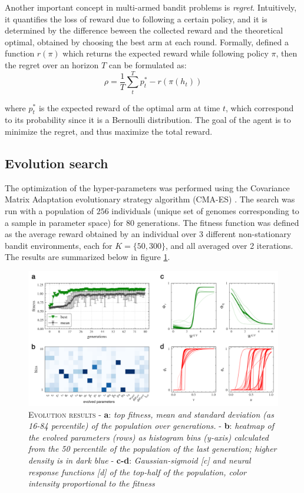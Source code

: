 Another important concept in multi-armed bandit problems is \textit{regret}. Intuitively, it quantifies the loss of reward due to following a certain policy, and it is determined by the difference beween the collected reward and the theoretical optimal, obtained by choosing the best arm at each round.
Formally, defined a function $r(\pi)$ which returns the expected reward while following policy $\pi$, then the regret over an horizon $T$ can be formulated as:
\begin{equation}
    \rho = \frac{1}{T}\sum^{T}_{t} p^{*}_{t} -r(\pi(h_{t}))
\end{equation}

\noindent where $p^{*}_{t}$ is the expected reward of the optimal arm at time $t$, which correspond to its probability since it is a Bernoulli distribution.
\noindent The goal of the agent is to minimize the regret, and thus maximize the total reward.



\subsection{Evolution search}
The optimization of the hyper-parameters was performed using the Covariance Matrix Adaptation evolutionary strategy algorithm (CMA-ES) \cite{igelCovarianceMatrixAdaptation2007}.
The search was run with a population of $256$ individuals (unique set of genomes corresponding to a sample in parameter space) for $80$ generations.
The fitness function was defined as the average reward obtained by an individual over 3 different non-stationary bandit environments, each for $K=\{50, 300\}$, and all averaged over 2 iterations.
The results are summarized below in figure \ref{fig:evolution}.

\begin{figure}[H]
    \centering
    \includegraphics[width=1.0\textwidth]{figures/evolution_comp_1.png}
    \caption{\textsc{Evolution results} - \textbf{a}: \textit{top fitness, mean and standard deviation (as 16-84 percentile) of the population over generations.} - \textbf{b}: \textit{heatmap of the evolved parameters (rows) as histogram bins (y-axis) calculated from the 50 percentile of the
    population of the last generation; higher density is in dark blue} - \textbf{c-d}: \textit{Gaussian-sigmoid [c] and neural response functions [d] of the top-half of the population, color intensity proportional to the fitness}}
    \label{fig:evolution}
\end{figure}

